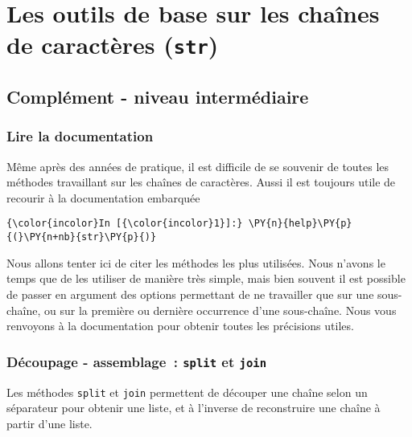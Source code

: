     \hypertarget{les-outils-de-base-sur-les-chauxeenes-de-caractuxe8res-str}{%
\section{\texorpdfstring{Les outils de base sur les chaînes de
caractères
(\texttt{str})}{Les outils de base sur les chaînes de caractères (str)}}\label{les-outils-de-base-sur-les-chauxeenes-de-caractuxe8res-str}}

    \hypertarget{compluxe9ment---niveau-intermuxe9diaire}{%
\subsection{Complément - niveau
intermédiaire}\label{compluxe9ment---niveau-intermuxe9diaire}}

    \hypertarget{lire-la-documentation}{%
\subsubsection{Lire la documentation}\label{lire-la-documentation}}

    Même après des années de pratique, il est difficile de se souvenir de
toutes les méthodes travaillant sur les chaînes de caractères. Aussi il
est toujours utile de recourir à la documentation embarquée

    \begin{Verbatim}[commandchars=\\\{\}]
{\color{incolor}In [{\color{incolor}1}]:} \PY{n}{help}\PY{p}{(}\PY{n+nb}{str}\PY{p}{)}
\end{Verbatim}


    Nous allons tenter ici de citer les méthodes les plus utilisées. Nous
n'avons le temps que de les utiliser de manière très simple, mais bien
souvent il est possible de passer en argument des options permettant de
ne travailler que sur une sous-chaîne, ou sur la première ou dernière
occurrence d'une sous-chaîne. Nous vous renvoyons à la documentation
pour obtenir toutes les précisions utiles.

    \hypertarget{duxe9coupage---assemblage-split-et-join}{%
\subsubsection{\texorpdfstring{Découpage - assemblage~: \texttt{split}
et
\texttt{join}}{Découpage - assemblage~: split et join}}\label{duxe9coupage---assemblage-split-et-join}}

    Les méthodes \texttt{split} et \texttt{join} permettent de découper une
chaîne selon un séparateur pour obtenir une liste, et à l'inverse de
reconstruire une chaîne à partir d'une liste.

